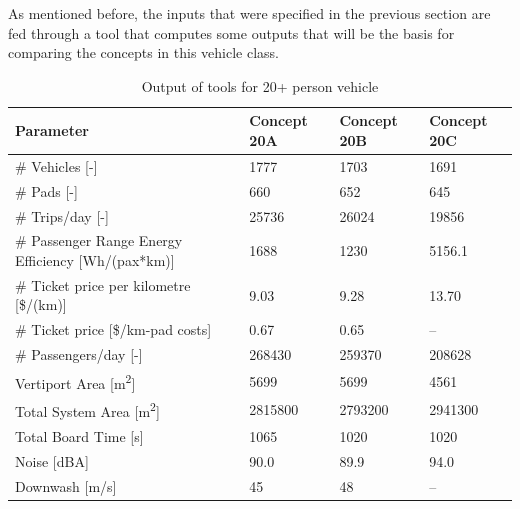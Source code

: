 As mentioned before, the inputs that were specified in the previous section are fed through a tool that computes some outputs that will be the basis for comparing the concepts in this vehicle class.  


\begin{table}[H]
\captionsetup{justification=centering}
\caption{Output of tools for 20+ person vehicle}
\label{20output}
\begin{tabular}{@{}llll@{}}
\toprule
\textbf{Parameter}                           & \textbf{Concept 20A} & \textbf{Concept 20B} & \textbf{Concept 20C} \\ \midrule
\# Vehicles {[}-{]}                          &       1777             &     1703            &      1691                 \\
\# Pads {[}-{]}                              &         660           &      652           &          645            \\
\# Trips/day {[}-{]}                         &         25736           &       26024          &         19856               \\
\# Passenger Range Energy Efficiency {[}Wh/(pax*km){]}           &        1688           &       1230         &         5156.1            \\
\# Ticket price per kilometre {[}\$/(km){]} &           9.03           &           9.28       &        13.70               \\
\# Ticket price {[}\$/km-pad costs{]}        & 0.67                    &      0.65            &   --            \\
\# Passengers/day {[}-{]}                    &         268430           &       259370          &      208628               \\
Vertiport Area {[}m\textsuperscript{2}{]}    &           5699         &        5699         &        4561              \\
Total System Area {[}m\textsuperscript{2}{]} &       2815800             &      2793200           &       2941300               \\
Total Board Time {[}s{]}                     & 1065                   &     1020            &      1020                \\
Noise {[}dBA{]}                              &           90.0        &      89.9           &       94.0                   \\
Downwash {[}m/s{]}                              &             45       &     48          &  --   \\ \bottomrule
\end{tabular}

\end{table}

